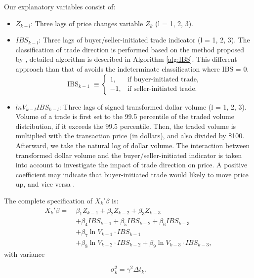 Our explanatory variables consist of:
\begin{itemize}
    \item $Z_{k-l}$: Three lags of price changes variable $Z_k$ (l = 1, 2, 3).
    \item $IBS_{k-l}$: Three lags of buyer/seller-initiated trade indicator (l = 1, 2, 3). The classification of trade direction is performed based on the method proposed by \citet{leeready1991}, detailed algorithm is described in Algorithm \ref{alg:IBS}. This different approach than that of \citet{hausman1992} avoids the indeterminate classification where IBS = 0.
    \begin{equation}
\mathrm{IBS}_{k-1} \;\equiv
\begin{cases}
1,  & \text{if buyer-initiated trade},\\
-1, & \text{if seller-initiated trade}.
\end{cases}
\label{eq:5}
\end{equation}
    
       \item$lnV_{k-l}IBS_{k-l}$: Three lags of signed transformed dollar volume (l = 1, 2, 3). Volume of a trade is first set to the 99.5 percentile of the traded volume distribution, if it exceeds the 99.5 percentile. Then, the traded volume is multiplied with the transaction price (in dollars), and also divided by \$100. Afterward, we take the natural log of dollar volume. 
       The interaction between transformed dollar volume and the buyer/seller-initiated indicator is taken into account to investigate the impact of trade direction on price. A positive coefficient may indicate that buyer-initiated trade would likely to move price up, and vice versa \citep{hausman1992, easleyohara1987}.
\end{itemize}

The complete specification of \(X_k' \beta\) is:
\begin{align}
X_k' \beta =\ & \beta_1 Z_{k-1} + \beta_2 Z_{k-2} + \beta_3 Z_{k-3} \nonumber \\
& + \beta_4 IBS_{k-1} + \beta_5 IBS_{k-2} + \beta_6 IBS_{k-3} \nonumber \\
& + \beta_7 \ln V_{k-1} \cdot IBS_{k-1} \nonumber \\
& + \beta_8 \ln V_{k-2} \cdot IBS_{k-2} + \beta_9 \ln V_{k-3} \cdot IBS_{k-3}, \label{eq:6}
\end{align}
with variance 

\begin{equation}
\sigma_k^2 = \gamma^2 \Delta t_k.
\label{eq:7}
\end{equation}

